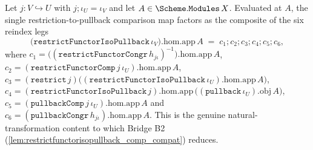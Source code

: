 \begin{lemma}
  \label{lem:restrictfunctorisopullback_comp_compat_hom}
  Let \(j : V \hookrightarrow U\) with \(j \mathbin{;} \iota_U = \iota_V\) and let
  \(A \in \Scheme.\mathtt{Modules}\,X\). Evaluated at \(A\), the single restriction-to-pullback
  comparison map factors as the composite of the six reindex legs
  \[
    \bigl(\mathtt{restrictFunctorIsoPullback}\,\iota_V\bigr).\mathrm{hom}.\mathrm{app}\,A
      \;=\; c_1 \mathbin{;} c_2 \mathbin{;} c_3 \mathbin{;} c_4 \mathbin{;} c_5 \mathbin{;} c_6,
  \]
  where
  \(c_1 = \bigl((\mathtt{restrictFunctorCongr}\,h_{j\iota})^{-1}\bigr).\mathrm{hom}.\mathrm{app}\,A\),
  \(c_2 = (\mathtt{restrictFunctorComp}\,j\,\iota_U).\mathrm{hom}.\mathrm{app}\,A\),
  \(c_3 = (\mathtt{restrict}\,j)\bigl((\mathtt{restrictFunctorIsoPullback}\,\iota_U).\mathrm{hom}.\mathrm{app}\,A\bigr)\),
  \(c_4 = (\mathtt{restrictFunctorIsoPullback}\,j).\mathrm{hom}.\mathrm{app}\,\bigl((\mathtt{pullback}\,\iota_U).\mathrm{obj}\,A\bigr)\),
  \(c_5 = (\mathtt{pullbackComp}\,j\,\iota_U).\mathrm{hom}.\mathrm{app}\,A\) and
  \(c_6 = (\mathtt{pullbackCongr}\,h_{j\iota}).\mathrm{hom}.\mathrm{app}\,A\). This is the genuine
  natural-transformation content to which Bridge B2
  (\cref{lem:restrictfunctorisopullback_comp_compat}) reduces.
\end{lemma}
